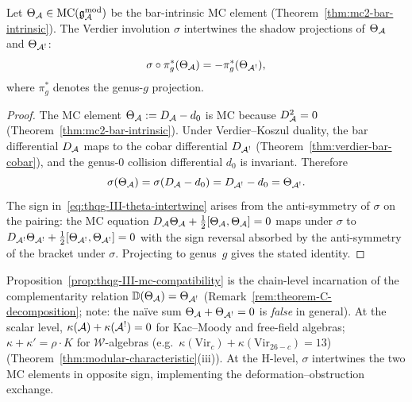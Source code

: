 \begin{proposition}
\label{prop:thqg-III-mc-compatibility}
Let $\Theta_{\mathcal{A}} \in \mathrm{MC}(\mathfrak{g}_{\mathcal{A}}^{\mathrm{mod}})$ be the
bar-intrinsic MC element
\textup{(}Theorem~\textup{\ref{thm:mc2-bar-intrinsic})}.
The Verdier involution $\sigma$ intertwines the shadow projections
of $\Theta_{\mathcal{A}}$ and $\Theta_{\mathcal{A}^!}$:
\begin{equation}\label{eq:thqg-III-theta-intertwine}
\sigma \circ \pi_g^*(\Theta_{\mathcal{A}})
= -\pi_g^*(\Theta_{\mathcal{A}^!}),
\end{equation}
where $\pi_g^*$ denotes the genus-$g$ projection.
\end{proposition}

\begin{proof}
The MC element $\Theta_{\mathcal{A}} := D_{\mathcal{A}} - d_0$ is MC because
$D_{\mathcal{A}}^2 = 0$
(Theorem~\ref{thm:mc2-bar-intrinsic}).
Under Verdier--Koszul duality, the bar differential $D_{\mathcal{A}}$
maps to the cobar differential $D_{\mathcal{A}^!}$
(Theorem~\ref{thm:verdier-bar-cobar}), and the genus-$0$
collision differential $d_0$ is invariant. Therefore
\[
\sigma(\Theta_{\mathcal{A}})
= \sigma(D_{\mathcal{A}} - d_0)
= D_{\mathcal{A}^!} - d_0
= \Theta_{\mathcal{A}^!}.
\]
The sign in~\eqref{eq:thqg-III-theta-intertwine} arises from
the anti-symmetry of $\sigma$ on the pairing: the MC equation
$D_{\mathcal{A}} \Theta_{\mathcal{A}} + \tfrac{1}{2}[\Theta_{\mathcal{A}}, \Theta_{\mathcal{A}}] = 0$
maps under $\sigma$ to
$D_{\mathcal{A}^!} \Theta_{\mathcal{A}^!} +
\tfrac{1}{2}[\Theta_{\mathcal{A}^!}, \Theta_{\mathcal{A}^!}] = 0$
with the sign reversal absorbed by the anti-symmetry of the
bracket under $\sigma$. Projecting to genus~$g$ gives the
stated identity.
\end{proof}

\begin{remark}
\label{rem:thqg-III-chain-level}
Proposition~\ref{prop:thqg-III-mc-compatibility} is the
chain-level incarnation of the complementarity relation
$\mathbb{D}(\Theta_{\mathcal{A}}) = \Theta_{\mathcal{A}^!}$
(Remark~\ref{rem:theorem-C-decomposition}; note: the
na\"ive sum $\Theta_{\mathcal{A}} + \Theta_{\mathcal{A}^!} = 0$ is
\emph{false} in general).
At the scalar level,
$\kappa(\mathcal{A}) + \kappa(\mathcal{A}^!) = 0$ for Kac--Moody and free-field algebras;
$\kappa + \kappa' = \rho \cdot K$ for
$\mathcal{W}$-algebras (e.g.\ $\kappa(\mathrm{Vir}_c) + \kappa(\mathrm{Vir}_{26-c}) = 13$)
(Theorem~\ref{thm:modular-characteristic}(iii)).
At the H-level, $\sigma$ intertwines the two MC elements in
opposite sign, implementing the deformation--obstruction
exchange.
\end{remark}

